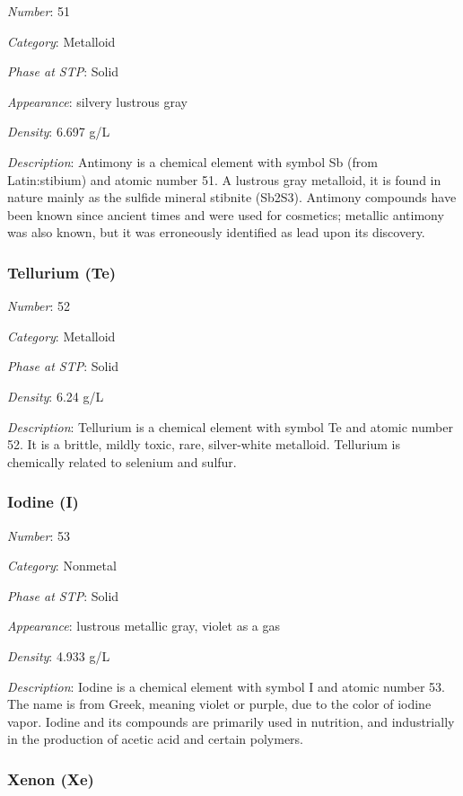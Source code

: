 \documentclass{article}
\begin{document}
\textit{Number}: 51

\textit{Category}: Metalloid

\textit{Phase at STP}: Solid

\textit{Appearance}: silvery lustrous gray

\textit{Density}: 6.697 g/L

\textit{Description}: Antimony is a chemical element with symbol Sb (from Latin:stibium) and atomic number 51. A lustrous gray metalloid, it is found in nature mainly as the sulfide mineral stibnite (Sb2S3). Antimony compounds have been known since ancient times and were used for cosmetics; metallic antimony was also known, but it was erroneously identified as lead upon its discovery.

\hypertarget{subsubsection::Te}{}\subsubsection{Tellurium (Te)}

\textit{Number}: 52

\textit{Category}: Metalloid

\textit{Phase at STP}: Solid

\textit{Density}: 6.24 g/L

\textit{Description}: Tellurium is a chemical element with symbol Te and atomic number 52. It is a brittle, mildly toxic, rare, silver-white metalloid. Tellurium is chemically related to selenium and sulfur.

\hypertarget{subsubsection::I}{}\subsubsection{Iodine (I)}

\textit{Number}: 53

\textit{Category}: Nonmetal

\textit{Phase at STP}: Solid

\textit{Appearance}: lustrous metallic gray, violet as a gas

\textit{Density}: 4.933 g/L

\textit{Description}: Iodine is a chemical element with symbol I and atomic number 53. The name is from Greek, meaning violet or purple, due to the color of iodine vapor. Iodine and its compounds are primarily used in nutrition, and industrially in the production of acetic acid and certain polymers.

\hypertarget{subsubsection::Xe}{}\subsubsection{Xenon (Xe)}
\end{document}
